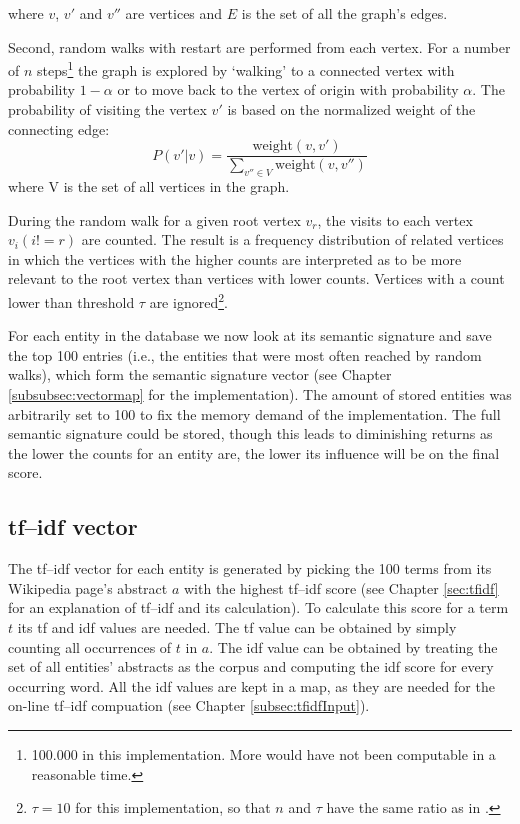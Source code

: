 \documentclass[runningheads,a4paper]{llncs}
\begin{document}
{where $v$, $v'$ and $v''$ are vertices and $E$ is the set of all the graph's edges.

Second, random walks with restart are performed from each vertex. For a number of $n$ steps\footnote{100.000 in this implementation. More would have not been computable in a reasonable time.} the graph is explored by `walking' to a connected vertex with probability $1 - \alpha$ or to move back to the vertex of origin with probability $\alpha$. The probability of visiting the vertex $v'$ is based on the normalized weight of the connecting edge:
$$P(v'|v) = \frac{\mathrm{weight}(v, v')}{\sum _{v''\in V} \mathrm{weight}(v, v'')}$$
where V is the set of all vertices in the graph.

During the random walk for a given root vertex $v_r$, the visits to each vertex $v_i (i != r)$ are counted. The result is a frequency distribution of related vertices in which the vertices with the higher counts are interpreted as to be more relevant to the root vertex than vertices with lower counts. Vertices with a count lower than threshold $\tau$ are ignored\footnote{$\tau = 10$ for this implementation, so that $n$ and $\tau$ have the same ratio as in \cite{Babelfy}.}.

For each entity in the database we now look at its semantic signature and save the top 100 entries (i.e., the entities that were most often reached by random walks), which form the semantic signature vector (see Chapter \ref{subsubsec:vectormap} for the implementation). The amount of stored entities was arbitrarily set to 100 to fix the memory demand of the implementation. The full semantic signature could be stored, though this leads to diminishing returns as the lower the counts for an entity are, the lower its influence will be on the final score.

\subsection{tf--idf vector}\label{sec:offlineTFIDF}
The tf--idf vector for each entity is generated by picking the 100 terms from its Wikipedia page's abstract $a$ with the highest tf--idf score (see Chapter \ref{sec:tfidf} for an explanation of tf--idf and its calculation). To calculate this score for a term $t$ its tf and idf values are needed. The tf value can be obtained by simply counting all occurrences of $t$ in $a$. The idf value can be obtained by treating the set of all entities' abstracts as the corpus and computing the idf score for every occurring word. All the idf values are kept in a map, as they are needed for the on-line tf--idf compuation (see Chapter \ref{subsec:tfidfInput}).

}
\end{document}
